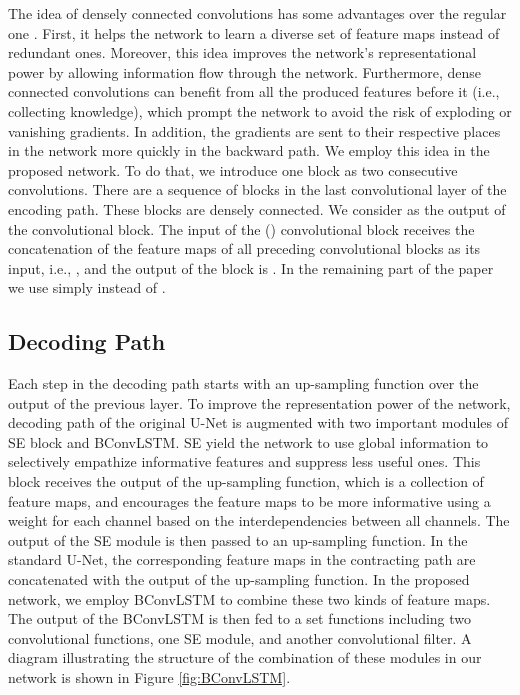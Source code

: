 \documentclass[journal]{IEEEtran}
\begin{document}
The idea of densely connected convolutions has some advantages over the regular one \cite{huang2017densely}. First, it helps the network to learn a diverse set of feature maps instead of redundant ones. Moreover, this idea improves the network's representational power by allowing information flow through the network. Furthermore, dense connected convolutions can benefit from all the produced features before it (i.e., collecting knowledge), which prompt the network to avoid the risk of exploding or vanishing gradients. In addition, the gradients are sent to their respective places in the network more quickly in the backward path. 
We employ this idea in the proposed network. To do that, we introduce one block as two consecutive convolutions. There are a sequence of  blocks in the last convolutional layer of the encoding path. These blocks are densely connected. We consider  as the output of the  convolutional block. The input of the  () convolutional block receives the concatenation of the feature maps of all preceding convolutional blocks as its input, i.e.,  , and the output of the  block is . In the remaining part of the paper we use simply  instead of .

  





\subsection{Decoding Path}
Each step in the decoding path starts with an up-sampling function over the output of the previous layer. To improve the representation power of the network, decoding path of the original U-Net is augmented with two important modules of SE block and BConvLSTM. 
SE yield the network to use global information to selectively empathize informative features and suppress less useful ones. This block receives the output of the up-sampling function, which is a collection of feature maps, and encourages the feature maps to be more informative using a weight for each channel based on the interdependencies between all channels. 
The output of the SE module is then passed to an up-sampling function. In the standard U-Net, the corresponding feature maps in the contracting path are concatenated with the output of the up-sampling function. In the proposed network, we employ BConvLSTM to combine these two kinds of feature maps. The output of the BConvLSTM is then fed to a set functions including two convolutional functions, one SE module, and another convolutional filter. A diagram illustrating the structure of the combination of these modules in our network is shown in Figure \ref{fig:BConvLSTM}.
\end{document}
